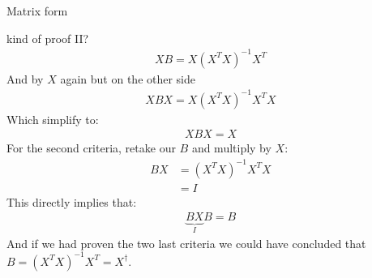 \begin{parag}{Matrix form}
\begin{subparag}{kind of proof II?}
			\begin{align*} 
				XB = X\left(X^{T}X\right)^{-1}X^{T}
			\end{align*}
			And by $X$ again but on the other side
			\begin{align*} 
				XBX = X\left(X^{T}X\right)^{-1}X^{T}X
			\end{align*}
			Which simplify to:
			\begin{align*} 
				XBX = X
			\end{align*}
			For the second criteria, retake our $B$ and multiply by $X$:
			\begin{align*} 
				BX &= \left(X^{T}X\right)^{-1}X^{T}X\\
				   &= I
			\end{align*}
			This directly implies that:
			\begin{align*} 
				\underbrace{BX}_{I}B =  B
			\end{align*}
			And if we had proven the two last criteria we could have concluded that $B = \left(X^{T}X\right)^{-1}X^{T} = X^{\dagger}$.
		\end{subparag}
	\end{parag}
	
